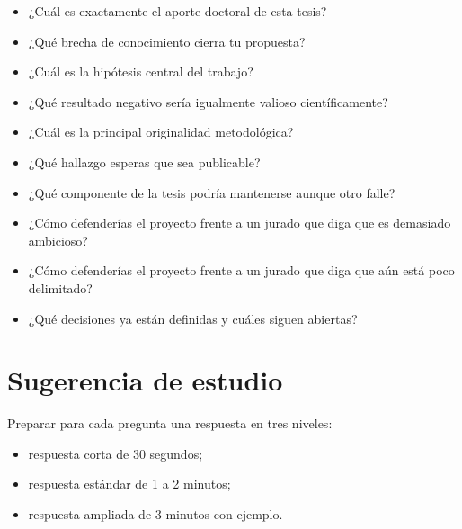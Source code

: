 \documentclass[11pt]{article}
\begin{document}
\begin{itemize}[leftmargin=*]
    \item ¿Cuál es exactamente el aporte doctoral de esta tesis?
    \item ¿Qué brecha de conocimiento cierra tu propuesta?
    \item ¿Cuál es la hipótesis central del trabajo?
    \item ¿Qué resultado negativo sería igualmente valioso científicamente?
    \item ¿Cuál es la principal originalidad metodológica?
    \item ¿Qué hallazgo esperas que sea publicable?
    \item ¿Qué componente de la tesis podría mantenerse aunque otro falle?
    \item ¿Cómo defenderías el proyecto frente a un jurado que diga que es demasiado ambicioso?
    \item ¿Cómo defenderías el proyecto frente a un jurado que diga que aún está poco delimitado?
    \item ¿Qué decisiones ya están definidas y cuáles siguen abiertas?
\end{itemize}

\section*{Sugerencia de estudio}
Preparar para cada pregunta una respuesta en tres niveles:
\begin{itemize}[leftmargin=*]
    \item respuesta corta de 30 segundos;
    \item respuesta estándar de 1 a 2 minutos;
    \item respuesta ampliada de 3 minutos con ejemplo.
\end{itemize}
\end{document}
